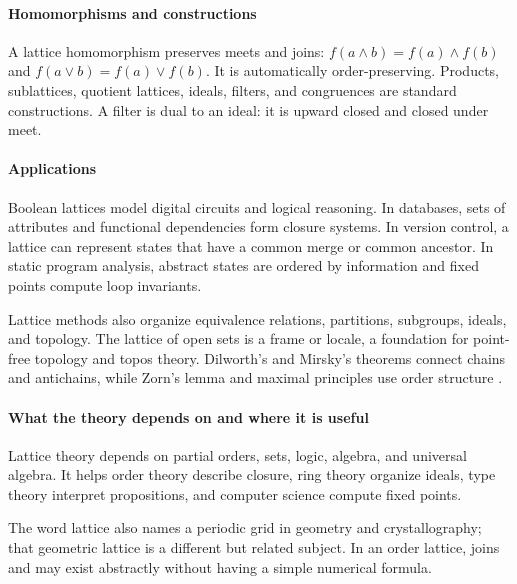 \paragraph{Homomorphisms and constructions}
A lattice homomorphism preserves meets and joins: $f(a\wedge b)=f(a)\wedge f(b)$ and $f(a\vee b)=f(a)\vee f(b)$. It is automatically order-preserving. Products, sublattices, quotient lattices, ideals, filters, and congruences are standard constructions. A filter is dual to an ideal: it is upward closed and closed under meet.

\paragraph{Applications}
Boolean lattices model digital circuits and logical reasoning. In databases, sets of attributes and functional dependencies form closure systems. In version control, a lattice can represent states that have a common merge or common ancestor. In static program analysis, abstract states are ordered by information and fixed points compute loop invariants.

Lattice methods also organize equivalence relations, partitions, subgroups, ideals, and topology. The lattice of open sets is a frame or locale, a foundation for point-free topology and topos theory. Dilworth's and Mirsky's theorems connect chains and antichains, while Zorn's lemma and maximal principles use order structure \cite{lattice_theory_ref3}.

\paragraph{What the theory depends on and where it is useful}
Lattice theory depends on partial orders, sets, logic, algebra, and universal algebra. It helps order theory describe closure, ring theory organize ideals, type theory interpret propositions, and computer science compute fixed points.

The word lattice also names a periodic grid in geometry and crystallography; that geometric lattice is a different but related subject. In an order lattice, joins and may exist abstractly without having a simple numerical formula.

